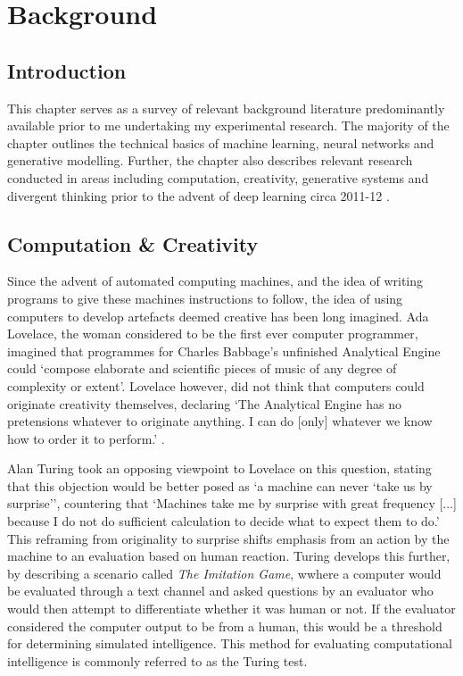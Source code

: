 \chapter{Background}
\label{ch:background}

\section{Introduction}

This chapter serves as a survey of relevant background literature predominantly available prior to me undertaking my experimental research.
The majority of the chapter outlines the technical basics of machine learning, neural networks and generative modelling.
Further, the chapter also describes relevant research conducted in areas including computation, creativity, generative systems and divergent thinking prior to the advent of deep learning circa 2011-12 \citep{krizhevsky2012imagenet}.

\section{Computation \& Creativity}

Since the advent of automated computing machines, and the idea of writing programs to give these machines instructions to follow, the idea of using computers to develop artefacts deemed creative has been long imagined. 
Ada Lovelace, the woman considered to be the first ever computer programmer, imagined that programmes for Charles Babbage's unfinished Analytical Engine could ‘compose elaborate and scientific pieces of music of any degree of complexity or extent’.
Lovelace however, did not think that computers could originate creativity themselves, declaring ‘The Analytical Engine has no pretensions whatever to originate anything. I can do [only] whatever we know how to order it to perform.' \citep{lovelace1843notes}.

Alan Turing took an opposing viewpoint to Lovelace on this question, stating that this objection would be better posed as ‘a machine can never ‘take us by surprise’’, countering that ‘Machines take me by surprise with great frequency [...] because I do not do sufficient calculation to decide what to expect them to do.’  \citep{machinery1950computing}
This reframing from originality to surprise shifts emphasis from an action by the machine to an evaluation based on human reaction. 
Turing develops this further, by describing a scenario called \textit{The Imitation Game}, wwhere a computer would be evaluated through a text channel and asked questions by an evaluator who would then attempt to differentiate whether it was human or not. 
If the evaluator considered the computer output to be from a human, this would be a threshold for determining simulated intelligence.
This method for evaluating computational intelligence is commonly referred to as the Turing test. 

